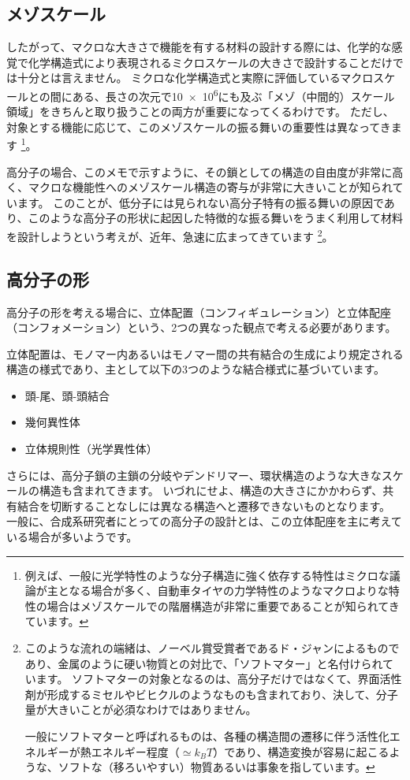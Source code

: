 \documentclass[a4paper,11pt]{jlreq}
\begin{document}
\subsection{メゾスケール}

したがって、マクロな大きさで機能を有する材料の設計する際には、化学的な感覚で化学構造式により表現されるミクロスケールの大きさで設計することだけでは十分とは言えません。
ミクロな化学構造式と実際に評価しているマクロスケールとの間にある、長さの次元で\num{10e6}にも及ぶ「メゾ（中間的）スケール領域」をきちんと取り扱うことの両方が重要になってくるわけです。
ただし、対象とする機能に応じて、このメゾスケールの振る舞いの重要性は異なってきます
\footnote
{
例えば、一般に光学特性のような分子構造に強く依存する特性はミクロな議論が主となる場合が多く、自動車タイヤの力学特性のようなマクロよりな特性の場合はメゾスケールでの階層構造が非常に重要であることが知られてきています。
}。

高分子の場合、このメモで示すように、その鎖としての構造の自由度が非常に高く、マクロな機能性へのメゾスケール構造の寄与が非常に大きいことが知られています。
このことが、低分子には見られない高分子特有の振る舞いの原因であり、このような高分子の形状に起因した特徴的な振る舞いをうまく利用して材料を設計しようという考えが、近年、急速に広まってきています
\footnote
{
このような流れの端緒は、ノーベル賞受賞者であるド・ジャンによるものであり、金属のように硬い物質との対比で、「ソフトマター」と名付けられています。
ソフトマターの対象となるのは、高分子だけではなくて、界面活性剤が形成するミセルやビヒクルのようなものも含まれており、決して、分子量が大きいことが必須なわけではありません。

一般にソフトマターと呼ばれるものは、各種の構造間の遷移に伴う活性化エネルギーが熱エネルギー程度（$\simeq k_B T$）であり、構造変換が容易に起こるような、ソフトな（移ろいやすい）物質あるいは事象を指しています。
}。
\subsection{高分子の形}

高分子の形を考える場合に、立体配置（コンフィギュレーション）と立体配座（コンフォメーション）という、2つの異なった観点で考える必要があります。

立体配置は、モノマー内あるいはモノマー間の共有結合の生成により規定される構造の様式であり、主として以下の3つのような結合様式に基づいています。
\begin{itemize}
\item 
頭-尾、頭-頭結合
\item
幾何異性体
\item
立体規則性（光学異性体）
\end{itemize}
さらには、高分子鎖の主鎖の分岐やデンドリマー、環状構造のような大きなスケールの構造も含まれてきます。
いづれにせよ、構造の大きさにかかわらず、共有結合を切断することなしには異なる構造へと遷移できないものとなります。
一般に、合成系研究者にとっての高分子の設計とは、この立体配座を主に考えている場合が多いようです。
\end{document}

